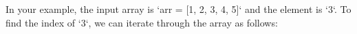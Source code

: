 \documentclass[preview]{standalone}
\begin{document}
In your example, the input array is `arr = [1, 2, 3, 4, 5]` and the element is `3`. To find the index of `3`, we can iterate through the array as follows:\\
\end{document}
